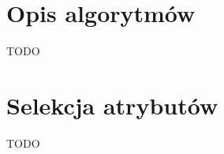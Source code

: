 \documentclass[a4paper,11pt,twoside]{mwrep}  %
\begin{document}
\begingroup
\let\clearpage\relax
\chapter{Opis algorytmów}

TODO\\

\endgroup



\begingroup
\let\clearpage\relax
\chapter{Selekcja atrybutów}
TODO\\
\endgroup


\end{document}
